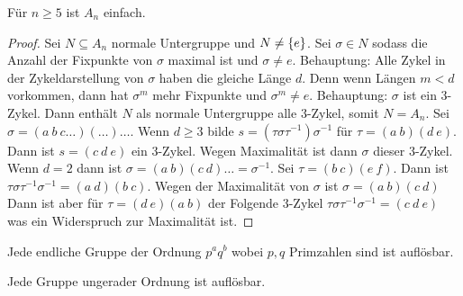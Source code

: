 \begin{Satz}
    Für \(n\geq 5\) ist \(A_n\) einfach.
\end{Satz}
\begin{proof}
    Sei \(N\subseteq A_n\) normale Untergruppe und \(N\neq\{e\}\).
    Sei \(\sigma\in N\) sodass die Anzahl der Fixpunkte von \(\sigma\) maximal ist und \(\sigma\neq e\).
    Behauptung: Alle Zykel in der Zykeldarstellung von \(\sigma\) haben die gleiche Länge \(d\). Denn wenn Längen \(m<d\) vorkommen, dann hat \(\sigma^m\) mehr Fixpunkte und \(\sigma^m\neq e\).
    Behauptung: \(\sigma\) ist ein 3-Zykel. Dann enthält \(N\) als normale Untergruppe alle \(3\)-Zykel, somit \(N=A_n\).
    Sei \(\sigma=(a\ b \ c\dots)(\dots)\dots\). 
    Wenn \(d\geq 3\) bilde \(s=(\tau \sigma\tau^{-1})\sigma^{-1}\) für \(\tau=(a\ b)(d\ e)\). Dann ist \(s=(c\ d\ e)\) ein 3-Zykel. Wegen Maximalität ist dann \(\sigma\) dieser 3-Zykel.
    Wenn \(d=2\) dann ist \(\sigma=(a\ b)(c \ d)\dots=\sigma^{-1}\).
    Sei \(\tau=(b\ c)(e\ f)\). Dann ist \(\tau\sigma\tau^{-1}\sigma^{-1}=(a\ d)(b\ c)\). Wegen der Maximalität von \(\sigma\) ist \(\sigma=(a\ b)(c\ d)\)
    Dann ist aber für \(\tau=(d\ e)(a\ b)\) der Folgende 3-Zykel \(\tau\sigma\tau^{-1}\sigma^{-1}=(c\ d\ e)\) was ein Widerspruch zur Maximalität ist.
\end{proof}
\begin{Satz}[Burnside 1911]
    Jede endliche Gruppe der Ordnung \(p^aq^b\) wobei \(p,q\) Primzahlen sind ist auflösbar.
\end{Satz}
\begin{Satz}
    Jede Gruppe ungerader Ordnung ist auflösbar.
\end{Satz}
